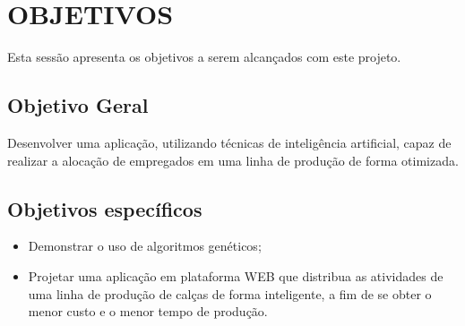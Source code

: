 \chapter{OBJETIVOS}

\par Esta sessão apresenta os objetivos a serem alcançados com este projeto.

\section{Objetivo Geral}

\begin{itemize}

  Desenvolver uma aplicação, utilizando técnicas de inteligência artificial,
  capaz de  realizar a alocação de empregados em uma linha de produção de forma
  otimizada.
  
\end{itemize}

\section{Objetivos específicos}
  
 \begin{itemize}

	\item Demonstrar o uso de algoritmos genéticos;
	  
	\item Projetar uma aplicação em plataforma WEB que distribua as atividades de
	uma linha de produção de calças de forma inteligente, a fim de se obter o
	menor custo e o menor tempo de produção.
	
 \end{itemize}
  